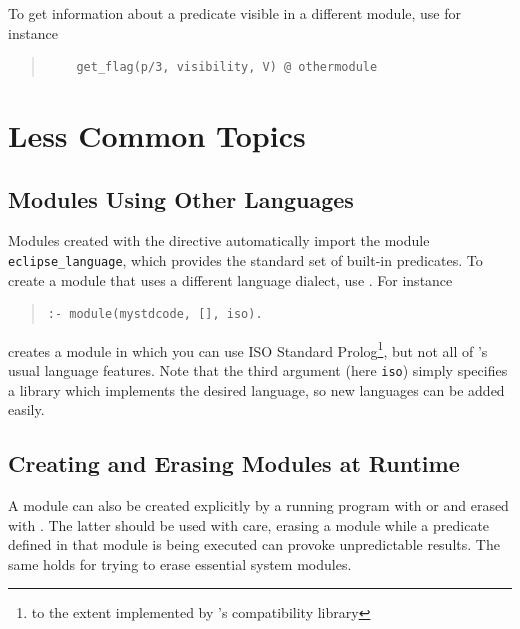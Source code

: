 To get information about a predicate visible in a different module,
use for instance
\begin{quote}\begin{verbatim}
    get_flag(p/3, visibility, V) @ othermodule
\end{verbatim}\end{quote}

\section{Less Common Topics}

\subsection{Modules Using Other Languages}

Modules created with the  directive automatically import
the module {\tt eclipse_language},  which provides the standard set
of {\eclipse} built-in predicates. 
To create a module that uses a different language dialect, use
.
For instance
\begin{quote}\begin{verbatim}
:- module(mystdcode, [], iso).
\end{verbatim}\end{quote}
creates a module in which you can use ISO Standard Prolog\footnote{to the
extent implemented by {\eclipse}'s compatibility library},
but not all of {\eclipse}'s usual language features.
Note that the third argument (here {\tt iso}) simply
specifies a library which implements the desired language,
so new languages can be added easily.


\subsection{Creating and Erasing Modules at Runtime}
\begin{sloppypar}
A module can also be created explicitly by a running program with
 or
and erased with
. 
The latter should be used with care, erasing a module while a
predicate defined in that module is being executed can provoke
unpredictable results. The same holds for trying to erase essential
system modules.
\end{sloppypar}


